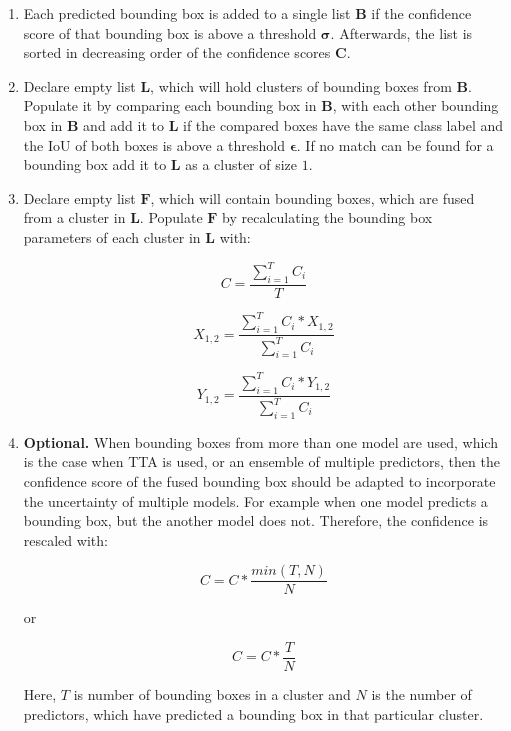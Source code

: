 \begin{enumerate}

    \item Each predicted bounding box is added to a single list $\mathbf{B}$ if the confidence score of that bounding box is above a threshold $\boldsymbol{\sigma}$. Afterwards, the list is sorted in decreasing order of the confidence scores $\mathbf{C}$.

    \item Declare empty list $\mathbf{L}$, which will hold clusters of bounding boxes from $\mathbf{B}$.  Populate it by comparing each bounding box in $\mathbf{B}$, with each other bounding box in $\mathbf{B}$ and add it to $\mathbf{L}$ if the compared boxes have the same class label and the \ac{IoU} of both boxes is above a threshold $\boldsymbol{\epsilon}$. If no match can be found for a bounding box add it to $\mathbf{L}$ as a cluster of size $1$.

    \item Declare empty list $\mathbf{F}$, which will contain bounding boxes, which are fused from a cluster in $\mathbf{L}$. Populate $\mathbf{F}$ by recalculating the bounding box parameters of each cluster in $\mathbf{L}$ with:

    \begin{equation}
        C = \frac{\sum^T_{i=1} C_i}{T}
    \end{equation}

    \begin{equation}
        X_{1,2} = \frac{\sum^T_{i=1} C_i * X_{1,2}}{\sum^T_{i=1} C_i}
    \end{equation}

    \begin{equation}
        Y_{1,2} = \frac{\sum^T_{i=1} C_i * Y_{1,2}}{\sum^T_{i=1} C_i}
    \end{equation}

    \item \textbf{Optional.} When bounding boxes from more than one model are used, which is the case when \ac{TTA} is used, or an ensemble of multiple predictors, then the confidence score of the fused bounding box should be adapted to incorporate the uncertainty of multiple models. For example when one model predicts a bounding box, but the another model does not. Therefore, the confidence is rescaled with:

    \begin{equation}
        C = C * \frac{min(T, N)}{N}
    \end{equation}

    or

    \begin{equation}
        C = C * \frac{T}{N}
    \end{equation}

    Here, $T$ is number of bounding boxes in a cluster and $N$ is the number of predictors, which have predicted a bounding box in that particular cluster.
\end{enumerate}
